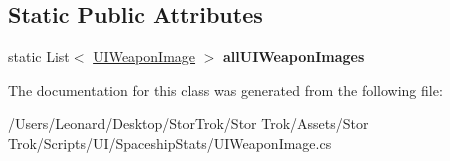 \subsection*{Static Public Attributes}
\begin{DoxyCompactItemize}
\item 
\mbox{\label{class_u_i_weapon_image_a0b8f2db26db368c5608d4b6d2183d77a}} 
static List$<$ \hyperlink{class_u_i_weapon_image}{U\+I\+Weapon\+Image} $>$ {\bfseries all\+U\+I\+Weapon\+Images}
\end{DoxyCompactItemize}


The documentation for this class was generated from the following file\+:\begin{DoxyCompactItemize}
\item 
/\+Users/\+Leonard/\+Desktop/\+Stor\+Trok/\+Stor Trok/\+Assets/\+Stor Trok/\+Scripts/\+U\+I/\+Spaceship\+Stats/U\+I\+Weapon\+Image.\+cs\end{DoxyCompactItemize}
